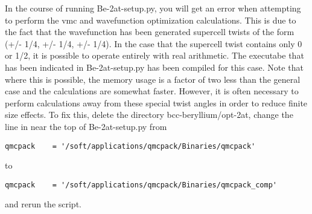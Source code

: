 In the course of running Be-2at-setup.py, you will get an error when attempting to perform the vmc and wavefunction optimization calculations.  This is due to the fact that the wavefunction has been generated supercell twists of the form (+/- 1/4, +/- 1/4, +/- 1/4).  In the case that the supercell twist contains only 0 or 1/2, it is possible to operate entirely with real arithmetic.  The executabe that has been indicated in Be-2at-setup.py has been compiled for this case.  Note that where this is possible, the memory usage is a factor of two less than the general case and the calculations are somewhat faster.  However, it is often necessary to perform calculations away from these special twist angles in order to reduce finite size effects.  To fix this, delete the directory bcc-beryllium/opt-2at, change the line in near the top of Be-2at-setup.py from 
\begin{lstlisting}
qmcpack    = '/soft/applications/qmcpack/Binaries/qmcpack'
\end{lstlisting}
to
\begin{lstlisting}
qmcpack    = '/soft/applications/qmcpack/Binaries/qmcpack_comp'
\end{lstlisting}
and rerun the script.

